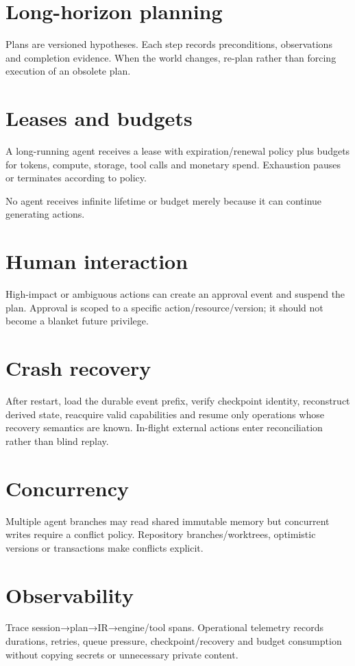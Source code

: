 \section{Long-horizon planning}
Plans are versioned hypotheses. Each step records preconditions, observations and completion evidence. When the world changes, re-plan rather than forcing execution of an obsolete plan.

\section{Leases and budgets}
A long-running agent receives a lease with expiration/renewal policy plus budgets for tokens, compute, storage, tool calls and monetary spend. Exhaustion pauses or terminates according to policy.

No agent receives infinite lifetime or budget merely because it can continue generating actions.

\section{Human interaction}
High-impact or ambiguous actions can create an approval event and suspend the plan. Approval is scoped to a specific action/resource/version; it should not become a blanket future privilege.

\section{Crash recovery}
After restart, load the durable event prefix, verify checkpoint identity, reconstruct derived state, reacquire valid capabilities and resume only operations whose recovery semantics are known. In-flight external actions enter reconciliation rather than blind replay.

\section{Concurrency}
Multiple agent branches may read shared immutable memory but concurrent writes require a conflict policy. Repository branches/worktrees, optimistic versions or transactions make conflicts explicit.

\section{Observability}
Trace session→plan→IR→engine/tool spans. Operational telemetry records durations, retries, queue pressure, checkpoint/recovery and budget consumption without copying secrets or unnecessary private content.

